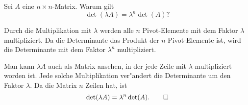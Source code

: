 Sei $A$ eine $n\times n$-Matrix. Warum gilt
\[
\det(\lambda A)=\lambda^n\det(A)?
\]

\begin{loesung}
Durch die Multiplikation mit $\lambda$ werden alle $n$ Pivot-Elemente mit dem
Faktor $\lambda$ multipliziert. Da die Determinante das Produkt der $n$ Pivot-Elemente
ist, wird die Determinante mit dem Faktor $\lambda^n$ multipliziert.

Man kann $\lambda A$ auch als Matrix ansehen, in der jede Zeile mit $\lambda$
multipliziert worden ist. Jede solche Multiplikation ver"andert die Determinante
um den Faktor $\lambda$. Da die Matrix $n$ Zeilen hat, ist
\[
\det(\lambda A)=\lambda^n \det(A).
\qedhere
\]
\end{loesung}
